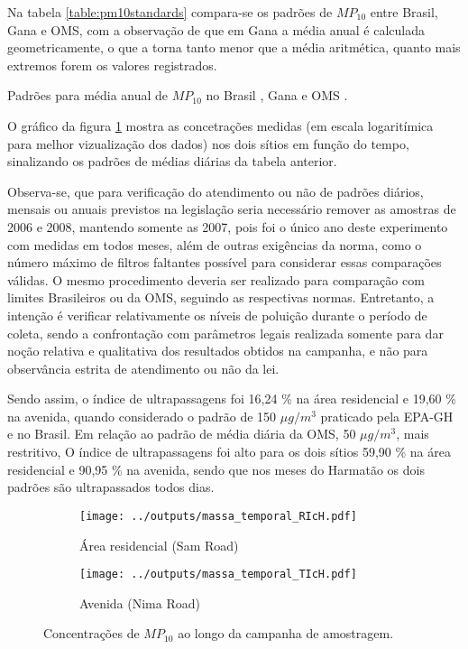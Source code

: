 Na tabela \ref{table:pm10standards} compara-se os padrões de $MP_{10}$ entre 
Brasil, Gana e OMS, com a observação de que em Gana a média anual é calculada 
geometricamente, o que a torna tanto menor que a média aritmética, 
quanto mais extremos forem os valores registrados.

\begin{table}[H]
\centering
  
  \caption{Padrões para média anual de $MP_{10}$ no Brasil \citep{conama1990}, 
           Gana \citep{epa2015} e OMS \citep{who}. \label{table:pm10standards}}
\end{table}

O gráfico da figura \ref{fig:massa_temporal_mp10} mostra as concetrações medidas
(em escala logaritímica para melhor vizualização dos dados) 
nos dois sítios em função do tempo, sinalizando os padrões de médias 
diárias da tabela anterior. 

Observa-se, que para verificação do atendimento ou não de padrões diários, 
mensais ou anuais previstos na legislação seria necessário remover as amostras 
de 2006 e 2008, mantendo somente as 2007, pois foi o único ano deste experimento
com medidas em todos meses, além de outras exigências da norma, como o 
número máximo de filtros faltantes possível para considerar essas comparações
válidas. O mesmo procedimento deveria ser realizado para comparação com 
limites Brasileiros ou da OMS, seguindo as respectivas normas. 
Entretanto, a intenção é verificar
relativamente os níveis de poluição durante o período de 
coleta, sendo a confrontação com parâmetros legais realizada somente para dar
noção relativa e qualitativa dos resultados obtidos na campanha, 
e não para observância estrita de atendimento ou não da lei.

Sendo assim, o índice de ultrapassagens foi 16,24 \% na área 
residencial e 19,60 \% na avenida, quando considerado o padrão de 150 
$\mu g / m^3$ praticado pela EPA-GH e no Brasil. Em relação
ao padrão de média diária da OMS, 50 $\mu g / m^3$, mais restritivo, 
O índice de ultrapassagens foi alto para os dois sítios 59,90 \% 
na área residencial e 90,95 \% na avenida, sendo que nos meses do Harmatão 
os dois padrões são ultrapassados todos dias. 

\begin{figure}[H]
  \centering
  \begin{subfigure}[b]{0.45\textwidth}
    \texttt{[image: ../outputs/massa\_temporal\_RIcH.pdf]}
    \caption{Área residencial (Sam Road)}
  \end{subfigure}%
  \begin{subfigure}[b]{0.45\textwidth}
    \texttt{[image: ../outputs/massa\_temporal\_TIcH.pdf]}
    \caption{Avenida (Nima Road)}
  \end{subfigure}
  \caption{Concentrações de $MP_{10}$ ao longo da campanha de amostragem.
           \label{fig:massa_temporal_mp10}}
\end{figure}

